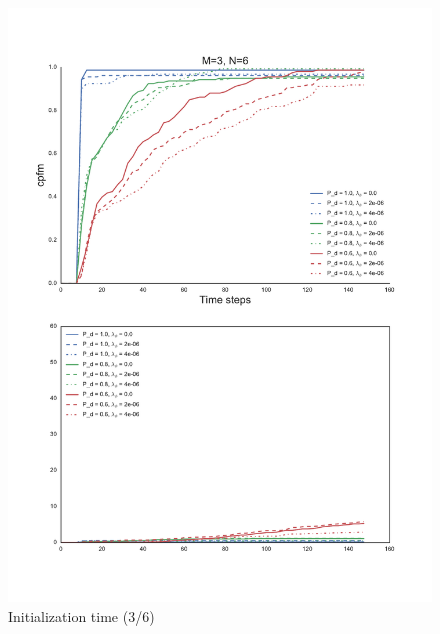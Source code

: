 \begin{figure}
\centering
\includegraphics[height = .9\textheight]{Figures/plots/Scenario1_Init-Time(3-6).pdf}
\caption{Initialization time (3/6)}\label{fig:init_time_3-6}
\end{figure}